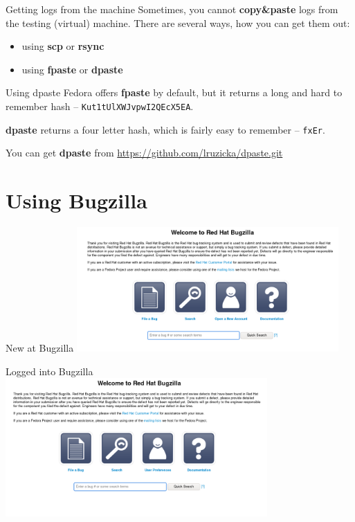 \documentclass[12pt]{beamer}
\begin{document}
\begin{frame}{Getting logs from the machine}
Sometimes, you cannot \textbf{copy\&paste} logs from the testing (virtual) machine. There are several ways, how you can get them out:

\begin{itemize}
 \item using \textbf{scp} or \textbf{rsync}
 \item using \textbf{fpaste} or \textbf{dpaste}	
\end{itemize}
\end{frame}

\begin{frame}{Using dpaste}
Fedora offers \textbf{fpaste} by default, but it returns a long and hard to remember hash -- \texttt{Kut1tUlXWJvpwI2QEcX5EA}. 

\vspace{5pt}

\textbf{dpaste} returns a four letter hash, which is fairly easy to remember -- \texttt{fxEr}.

\vspace{5pt}

You can get \textbf{dpaste} from \url{https://github.com/lruzicka/dpaste.git}
\end{frame}

\section{Using Bugzilla}
\begin{frame}{New at Bugzilla}
\includegraphics[width=10cm]{images/bz_new.png}
\end{frame}

\begin{frame}{Logged into Bugzilla}
\includegraphics[width=10cm]{images/bz_logged.png}
\end{frame}
\end{document}
